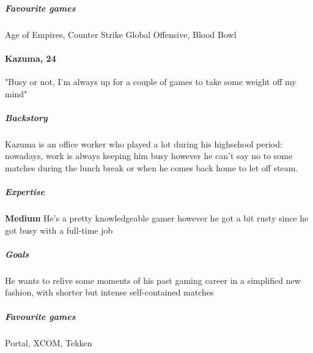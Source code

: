 \subparagraph{Favourite games}
Age of Empires, Counter Strike Global Offensive, Blood Bowl

\paragraph{Kazuma, 24} 


"Busy or not, I'm always up for a couple of games to take some weight off my mind"

\subparagraph{Backstory}
Kazuma is an office worker who played a lot during his highschool period: nowadays, work is always keeping him busy however he can't say no to some matches during the lunch break or when he comes back home to let off steam.

\subparagraph{Expertise}
\textbf{Medium} He's a pretty knowledgeable gamer however he got a bit rusty since he got busy with a full-time job

\subparagraph{Goals}
He wants to relive some moments of his past gaming career in a simplified new fashion, with shorter but intense self-contained matches

\subparagraph{Favourite games}
Portal, XCOM, Tekken 

\clearpage